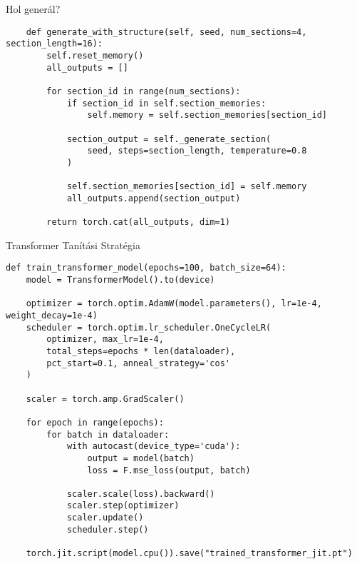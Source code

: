 \documentclass[aspectratio=169]{beamer}
\begin{document}
\begin{frame}[fragile]{Hol generál?}
    \begin{lstlisting}
    def generate_with_structure(self, seed, num_sections=4, section_length=16):
        self.reset_memory()
        all_outputs = []
        
        for section_id in range(num_sections):
            if section_id in self.section_memories:
                self.memory = self.section_memories[section_id]
            
            section_output = self._generate_section(
                seed, steps=section_length, temperature=0.8
            )
            
            self.section_memories[section_id] = self.memory
            all_outputs.append(section_output)
        
        return torch.cat(all_outputs, dim=1)
    \end{lstlisting}
\end{frame}

\begin{frame}[fragile]{Transformer Tanítási Stratégia}

\begin{lstlisting}
def train_transformer_model(epochs=100, batch_size=64):
    model = TransformerModel().to(device)
    
    optimizer = torch.optim.AdamW(model.parameters(), lr=1e-4, weight_decay=1e-4)
    scheduler = torch.optim.lr_scheduler.OneCycleLR(
        optimizer, max_lr=1e-4,
        total_steps=epochs * len(dataloader),
        pct_start=0.1, anneal_strategy='cos'
    )
    
    scaler = torch.amp.GradScaler()
    
    for epoch in range(epochs):
        for batch in dataloader:
            with autocast(device_type='cuda'):
                output = model(batch)
                loss = F.mse_loss(output, batch)
            
            scaler.scale(loss).backward()
            scaler.step(optimizer)
            scaler.update()
            scheduler.step()
    
    torch.jit.script(model.cpu()).save("trained_transformer_jit.pt")
\end{lstlisting}
\end{frame}
\end{document}
